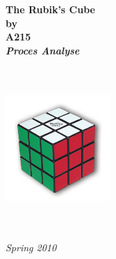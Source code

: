 \documentclass[a4paper]{article}
\begin{document}
\thispagestyle{empty}
\begin{center}        %
  \vspace{5mm}          %
  \LARGE
  \textbf{The Rubik's Cube} \\
  \Large
  \vspace{5mm}
  \textbf{by} \\
  \vspace{5mm}
  \large
  \textbf{A215} \\
  \vspace{10mm}
  \Large
  {\bf{\textsl{Proces Analyse}}} \\
   \vspace{2mm}
  {\bf{\textsl{}}} \\
  \vspace{5mm}
  {\large \textsl {}}\\
  
  
  \vspace{10mm}
  \centerline{\includegraphics[width=4cm,height=4cm]{../rapport/input/pics/rubiksCube}}
  \vspace{5mm}
  \textsl{} \\
  \textsl{} \\
  \vspace{10mm}
  \large
  \textsl{Spring 2010} \\
  \vspace{5mm}
  \normalsize
  \textsl{} \\
  \textsl{} \\
\end{center}

\ \pagebreak{}
\tableofcontents{}
\ \pagebreak{}

\pagebreak

\pagebreak

\pagebreak

\pagebreak

\end{document}
